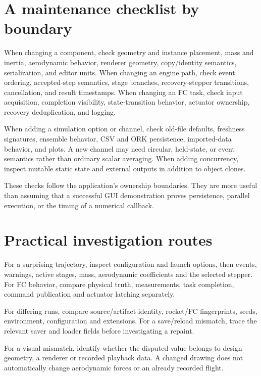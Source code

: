 


\section{A maintenance checklist by boundary}
When changing a component, check geometry and instance placement, mass and inertia, aerodynamic behavior, renderer geometry, copy/identity semantics, serialization, and editor units. When changing an engine path, check event ordering, accepted-step semantics, stage branches, recovery-stepper transitions, cancellation, and result timestamps. When changing an FC task, check input acquisition, completion visibility, state-transition behavior, actuator ownership, recovery deduplication, and logging.

When adding a simulation option or channel, check old-file defaults, freshness signatures, ensemble behavior, CSV and ORK persistence, imported-data behavior, and plots. A new channel may need circular, held-state, or event semantics rather than ordinary scalar averaging. When adding concurrency, inspect mutable static state and external outputs in addition to object clones.

These checks follow the application's ownership boundaries. They are more useful than assuming that a successful GUI demonstration proves persistence, parallel execution, or the timing of a numerical callback.

\section{Practical investigation routes}
For a surprising trajectory, inspect configuration and launch options, then events, warnings, active stages, mass, aerodynamic coefficients and the selected stepper. For FC behavior, compare physical truth, measurements, task completion, command publication and actuator latching separately.

For differing runs, compare source/artifact identity, rocket/FC fingerprints, seeds, environment, configuration and extensions. For a save/reload mismatch, trace the relevant saver and loader fields before investigating a repaint.

For a visual mismatch, identify whether the disputed value belongs to design geometry, a renderer or recorded playback data. A changed drawing does not automatically change aerodynamic forces or an already recorded flight.
